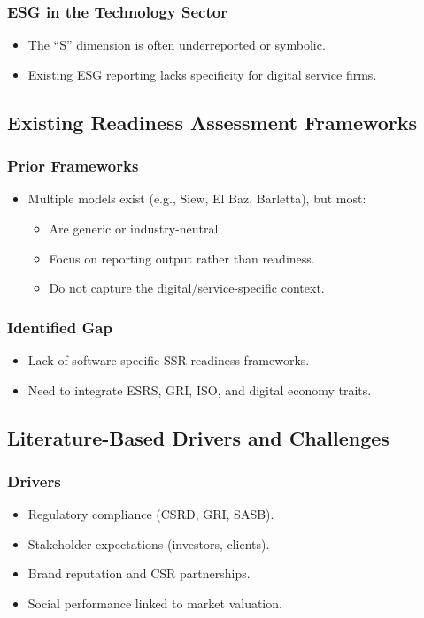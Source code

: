 \subsubsection{ESG in the Technology Sector}
\begin{itemize}
    \item The “S” dimension is often underreported or symbolic.
    \item Existing ESG reporting lacks specificity for digital service firms.
\end{itemize}

\subsection{Existing Readiness Assessment Frameworks}
\subsubsection{Prior Frameworks}
\begin{itemize}
    \item Multiple models exist (e.g., Siew, El Baz, Barletta), but most:
    \begin{itemize}
        \item Are generic or industry-neutral.
        \item Focus on reporting output rather than readiness.
        \item Do not capture the digital/service-specific context.
    \end{itemize}
\end{itemize}

\subsubsection{Identified Gap}
\begin{itemize}
    \item Lack of software-specific SSR readiness frameworks.
    \item Need to integrate ESRS, GRI, ISO, and digital economy traits.
\end{itemize}

\subsection{Literature-Based Drivers and Challenges}
\subsubsection{Drivers}
\begin{itemize}
    \item Regulatory compliance (CSRD, GRI, SASB).
    \item Stakeholder expectations (investors, clients).
    \item Brand reputation and CSR partnerships.
    \item Social performance linked to market valuation.
\end{itemize}

